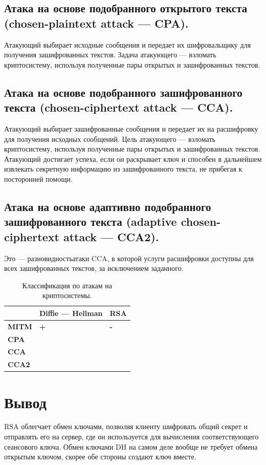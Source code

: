     \subsection{Атака на основе подобранного открытого текста (chosen-plaintext attack ---
    CPA).} 
	Атакующий выбирает исходные сообщения и передает их шифровальщику для получения зашифрованных текстов. Задача атакующего — взломать криптосистему, используя полученные пары открытых и зашифрованных текстов.
    
    \subsection{Атака на основе подобранного зашифрованного текста (chosen-ciphertext attack --- CCA).} 
	Атакующий выбирает зашифрованные сообщения и передает их на расшифровку для получения исходных сообщений. Цель атакующего — взломать криптосистему, используя полученные пары открытых
    и зашифрованных текстов. Атакующий достигает успеха, если он раскрывает ключ и способен в дальнейшем извлекать секретную информацию из
    зашифрованного текста, не прибегая к посторонней помощи.
    
    \subsection{Атака на основе адаптивно подобранного зашифрованного текста (adaptive chosen-ciphertext attack --- CCA2).} 
	Это — разновидностьатаки CCA, в которой услуги расшифровки доступны для всех зашифрованных текстов, за
    исключением заданного.
 
 	
 	
	 \begin{table}[h!]
		\begin{center}
			\caption{Классификация по атакам на криптосистемы.}
			\label{tbl:attack}
			\begin{tabular}{|p{2.5cm}|p{5cm}|p{5cm}|}
				\hline \textbf{} & \textbf{Diffie --- Hellman} & \textbf{RSA}  \\
				\hline \textbf{MITM} & \textbf{+} & \textbf{-} \\
				\hline \textbf{CPA} & \textbf{} & \textbf{} \\
				\hline \textbf{CCA} & \textbf{} & \textbf{}  \\
				\hline \textbf{CCA2} & \textbf{} & \textbf{} \\
				\hline
			\end{tabular}
		\end{center} 		
		
	\end{table}
        
    

    \section{Вывод}
    
    RSA облегчает обмен ключами, позволяя клиенту шифровать общий секрет и отправлять его на сервер, где он используется для вычисления соответствующего сеансового ключа. Обмен ключами DH на самом деле вообще не требует обмена открытым ключом, скорее обе стороны создают ключ вместе.

        